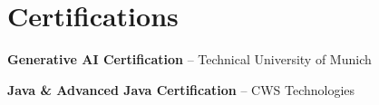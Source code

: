 \documentclass[letterpaper,10.8pt]{article}
\begin{document}
\section{Certifications}
\begin{itemize}[leftmargin=0.15in, label=\textbullet]
    \small{
      \item \textbf{Generative AI Certification} -- Technical University of Munich
      \item \textbf{Java \& Advanced Java Certification} -- CWS Technologies
    }
\end{itemize}
\end{document}
